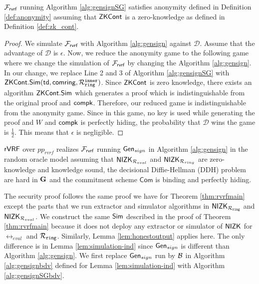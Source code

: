 \begin{lemma} \label{lem:anonymitySG} $ \mathcal{F}_{\textsf{rvrf}} $ running Algorithm \ref{alg:gensignSG} satisfies anonymity defined in Definition \ref{def:anonymity} assuming that ${\mathsf{ZKCont}} $ is a zero-knowledge as defined in Definition \ref{def:zk_cont}.
\end{lemma}

\begin{proof}
	We simulate $ \mathcal{F}_{\textsf{rvrf}} $ with Algorithm \ref{alg:gensign} against $ \mathcal{D} $. Assume that the advantage of $ \mathcal{D} $ is $ \epsilon $. Now, we reduce the anonymity game to the following game where we change the simulation of $ \mathcal{F}_{\textsf{rvrf}} $ by changing the Algorithm \ref{alg:gensign}. In our change, we replace Line 2 and 3 of Algorithm \ref{alg:gensignSG} with $ {\mathsf{ZKCont}}.{\mathsf{Sim}}(\mathsf{td}, \mathsf{comring},\mathcal{R}_{\mathtt{ring}}^{\mathtt{inner}}) $. Since $ {\mathsf{ZKCont}}$ is zero knowledge, there exists an algorithm  $ {\mathsf{ZKCont}}.{\mathsf{Sim}}$ which generates a proof which is indistinguishable from the original proof and $ \mathsf{compk} $. Therefore, our reduced game is indistinguishable from the anonymity game. Since in this game, no  key is used while generating the proof and $ W $ and $ \mathsf{compk} $ is perfectly hiding, the probability that  $ \mathcal{D} $ wins the game is $ \frac{1}{2} $. This means that $ \epsilon $ is negligible.		
\end{proof}

\begin{theorem}\label{thm:rvrfmain}
	$ {\mathsf{rVRF}} $  over  $ pp_{rvrf} $ realizes  $ \mathcal{F}_{\textsf{rvrf}} $ running $ \mathsf{Gen}_{sign} $ in Algorithm \ref{alg:gensign} \cite{canetti1,canetti2} in the random oracle model assuming that $ {\mathsf{NIZK}}_{\mathcal{R}_{eval}} $ and $ {\mathsf{NIZK}}_{\mathcal{R}_{ring}}$ are zero-knowledge and knowledge sound, the decisional Diffie-Hellman (DDH) problem are hard in $ {\mathbf{G}}  $  and the commitment scheme $ \mathsf{Com} $ is binding and perfectly hiding. 
\end{theorem}

The security proof follows the same proof we have for Theorem \ref{thm:rvrfmain} except the parts that we run extractor and simulator algorithms in $ {\mathsf{NIZK}}_{\mathcal{R}_{\mathtt{ring}}} $ and $ {\mathsf{NIZK}}_{\mathcal{R}_{eval}} $.
We construct the same $ \mathsf{Sim} $ described in the proof of Theorem \ref{thm:rvrfmain} because it does not deploy any extractor or simulator of $ {\mathsf{NIZK}} $ for $ \rel_{eval} $ and $ \mathcal{R}_{\mathtt{ring}} $. Similarly, Lemma \ref{lem:honestoutput} applies here. The only difference is in Lemma \ref{lem:simulation-ind} since $ \mathsf{Gen}_{sign} $ is different than Algorithm \ref{alg:gensign}.
We first replace $ \mathsf{Gen}_{sign} $ run by $ \mathcal{B} $ in Algorithm \ref{alg:gensignbdv} defined for Lemma \ref{lem:simulation-ind} with Algorithm \ref{alg:gensignSGbdv}.

